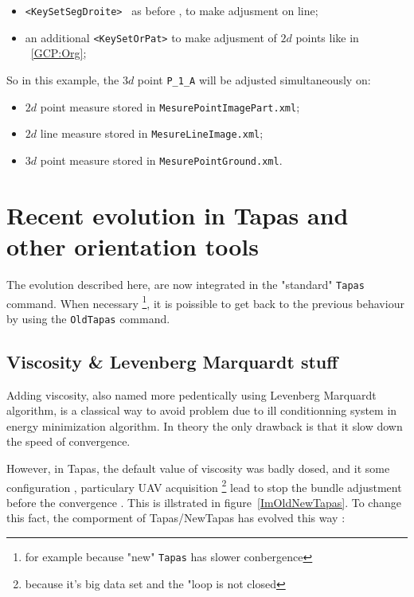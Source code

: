 \begin{itemize}
   \item  {\tt <KeySetSegDroite> } as before , to make adjusment on line;
   \item an additional {\tt  <KeySetOrPat>} to make adjusment of $2d$ points like in  ~\ref{GCP:Org};
   
\end{itemize}

So in this example, the $3d$ point {\tt P\_1\_A} will be adjusted simultaneously on:

\begin{itemize}
    \item $2d$ point measure stored in {\tt MesurePointImagePart.xml};
    \item $2d$ line measure stored in {\tt MesureLineImage.xml};
    \item $3d$ point measure stored in {\tt MesurePointGround.xml}.
\end{itemize}
 
\section{Recent evolution in Tapas and other orientation tools}

The evolution described here, are now integrated in the "standard" {\tt Tapas} command.
When necessary \footnote{for example because "new"  {\tt Tapas} has slower conbergence}, it is poissible
to get back to the previous behaviour by using the {\tt OldTapas} command.




\subsection{Viscosity \& Levenberg Marquardt stuff}

Adding viscosity, also named more pedentically using   Levenberg Marquardt algorithm,
is a classical way to avoid problem due to ill conditionning system in energy minimization algorithm.
In theory the only drawback is that it slow down the speed of convergence.

However, in Tapas, the default value of viscosity was badly dosed, and it  some configuration ,
particulary UAV acquisition \footnote{because it's big data set and the "loop is not closed}
lead to stop the bundle adjustment before the convergence . This is illstrated in figure~\ref{ImOldNewTapas}.
 To change this fact, the comporment of Tapas/NewTapas has evolved this way :

